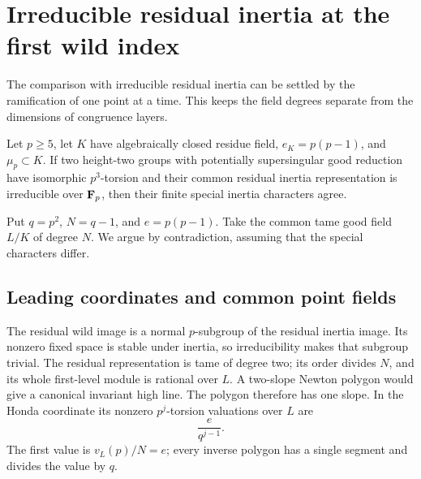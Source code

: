 \section{Irreducible residual inertia at the first wild index}\label{sec:irreducible}
The comparison with irreducible residual inertia can be settled by the ramification of one point at a time. This keeps the field degrees separate from the dimensions of congruence layers.

\begin{theorem}\label{thm:irreducible-recovery}
Let $p\ge5$, let $K$ have algebraically closed residue field, $e_K=p(p-1)$, and $\mu_p\subset K$. If two height-two groups with potentially supersingular good reduction have isomorphic $p^3$-torsion and their common residual inertia representation is irreducible over $\mathbf F_p$, then their finite special inertia characters agree.
\end{theorem}

Put $q=p^2$, $N=q-1$, and $e=p(p-1)$. Take the common tame good field $L/K$ of degree $N$. We argue by contradiction, assuming that the special characters differ.

\subsection{Leading coordinates and common point fields}
The residual wild image is a normal $p$-subgroup of the residual inertia image. Its nonzero fixed space is stable under inertia, so irreducibility makes that subgroup trivial. The residual representation is tame of degree two; its order divides $N$, and its whole first-level module is rational over $L$. A two-slope Newton polygon would give a canonical invariant high line. The polygon therefore has one slope. In the Honda coordinate its nonzero $p^j$-torsion valuations over $L$ are
\begin{equation}\label{eq:irreducible-values}
                              \frac e{q^{j-1}}.
\end{equation}
The first value is $v_L(p)/N=e$; every inverse polygon has a single segment and divides the value by $q$.


